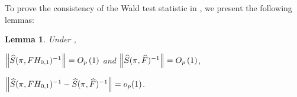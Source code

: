 \documentclass[12pt]{article}
\newtheorem{lemma}{Lemma}
\theoremstyle{plain}
\numberwithin{equation}{section}
\begin{document}

To prove the consistency of the Wald test statistic in , we present the following lemmas:
\begin{lemma}
\label{lem:Z_wald_lem}
Under , 
\begin{lemenum}
\item \label{lem:Z_wald_lem:1}
$\norm{\widehat{S}(\pi, F H_{0, 1})^{-1}} = O_p \left( 1 \right)$ and $\norm{\widehat{S}(\pi, \widehat{F})^{-1}} = O_p \left( 1 \right)$, 
\item \label{lem:Z_wald_lem:2}
$\norm{\widehat{S}(\pi, F H_{0, 1})^{-1} - \widehat{S}(\pi, \widehat{F})^{-1}} = o_p(1)$.
\end{lemenum}
\end{lemma}
\end{document}
